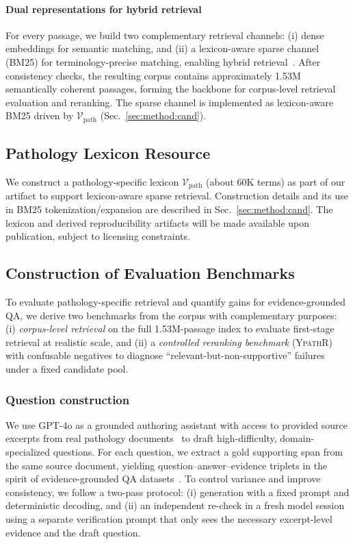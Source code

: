 \documentclass[preprint,12pt,a4paper]{elsarticle}
\begin{document}
\paragraph{Dual representations for hybrid retrieval}
For every passage, we build two complementary retrieval channels: (i) dense embeddings for semantic matching, and (ii) a lexicon-aware sparse channel (BM25) for terminology-precise matching, enabling hybrid retrieval~\cite{robertson2009bm25,chen2024m3embedding}.
After consistency checks, the resulting corpus contains approximately 1.53M semantically coherent passages, forming the backbone for corpus-level retrieval evaluation and reranking.
The sparse channel is implemented as lexicon-aware BM25 driven by $\mathcal{V}_{\text{path}}$ (Sec.~\ref{sec:method:cand}).

\subsection{Pathology Lexicon Resource}
\label{subsec:lexicon_sparse}
We construct a pathology-specific lexicon $\mathcal{V}_{\text{path}}$ (about 60K terms) as part of our artifact to support lexicon-aware sparse retrieval.
Construction details and its use in BM25 tokenization/expansion are described in Sec.~\ref{sec:method:cand}.
The lexicon and derived reproducibility artifacts will be made available upon publication, subject to licensing constraints.

\subsection{Construction of Evaluation Benchmarks}
\label{subsec:benchmarks_construct}
To evaluate pathology-specific retrieval and quantify gains for evidence-grounded QA, we derive two benchmarks from the corpus with complementary purposes:
(i) \emph{corpus-level retrieval} on the full 1.53M-passage index to evaluate first-stage retrieval at realistic scale, and
(ii) a \emph{controlled reranking benchmark} (\textsc{YpathR}) with confusable negatives to diagnose ``relevant-but-non-supportive'' failures under a fixed candidate pool.

\subsubsection{Question construction}
We use GPT-4o as a grounded authoring assistant with access to provided source excerpts from real pathology documents~\cite{openai2024gpt4o} to draft high-difficulty, domain-specialized questions.
For each question, we extract a gold supporting span from the same source document, yielding question--answer--evidence triplets in the spirit of evidence-grounded QA datasets~\cite{thorne2018fever,lewis2020rag,izacard2021leveraging}.
To control variance and improve consistency, we follow a two-pass protocol: (i) generation with a fixed prompt and deterministic decoding, and (ii) an independent re-check in a fresh model session using a separate verification prompt that only sees the necessary excerpt-level evidence and the draft question.
\end{document}

